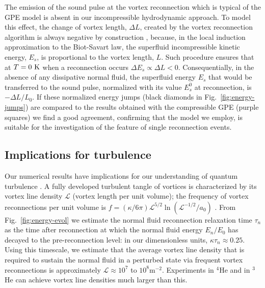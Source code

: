 \documentclass[9pt,twocolumn,twoside]{pnas-new}
\begin{document}
The emission of the sound pulse at the vortex reconnection 
\cite{leadbeaterSoundEmissionDue2001b} which is typical of the GPE model
is absent in our incompressible hydrodynamic approach. To model
this effect, the change of vortex length, $\Delta L$, created by the
vortex reconnection algorithm is always negative by construction
\cite{baggaleySensitivityVortexFilament2012a},
because, in the local induction approximation to the Biot-Savart law, 
the superfluid incompressible kinetic energy, $E_s$, is proportional to the vortex length,
$L$. Such procedure ensures that at $T=0~{\rm K}$ when a reconnection occurs
$\Delta E_s\propto \Delta L < 0$.
Consequentially, in the absence of any dissipative normal fluid, 
the superfluid energy 
$E_s$ that would be transferred to the sound pulse, normalized with its value $E_s^0$ at 
reconnection, is $-\Delta L/L_0$. 
If these normalized energy jumps (black diamonds
in Fig.~\ref{fig:energy-jumps}) are compared to the results obtained with the 
compressible GPE \cite{villoisIrreversibleDynamicsVortex2020} (purple squares)
we find a good agreement, confirming that the model we employ, 
is suitable for the investigation of the feature of single reconnection events.

\subsection*{Implications for turbulence}

Our numerical results have implications for our understanding of 
quantum turbulence \cite{BSS2023}.
A fully developed turbulent tangle of vortices is
characterized by its vortex line density $\mathcal{L}$ (vortex length
per unit volume); the frequency 
of vortex reconnections per unit volume is 
${f=(\kappa/6\pi)\mathcal{L}^{5/2}\ln(\mathcal{L}^{-1/2}/a_0)}$
\cite{barenghi2004}. From Fig.~\ref{fig:energy-evol} we estimate the 
normal fluid reconnection relaxation time $\tau_n$ as the time 
after reconnection at which the normal fluid energy $E_n/E_0$ has decayed
to the pre-reconnection level: in our dimensionless units, $\kappa \tau_n \approx 0.25$. 
Using this timescale, we estimate that
the average vortex line density that is required to sustain the normal fluid 
in a perturbed state via frequent vortex reconnections is approximately
$\mathcal{L} \approx 10^7$ to $10^8\mathrm{m}^{-2}$. Experiments in $^4$He
\cite{schwarz1981,milliken1982,roche2008,roche2007,Babuin2014} and in $^3$He
\cite{bradley2006} can achieve vortex line densities much larger than this.
\end{document}
